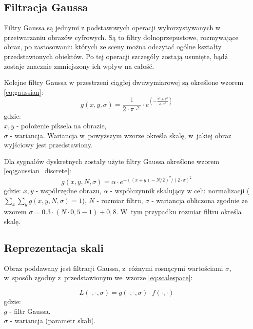\subsection{Filtracja Gaussa}
\label{subsec:filtracjaGaussa}
Filtry Gaussa są jednymi z podstawowych operacji wykorzystywanych w przetwarzaniu obrazów cyfrowych. Są to filtry dolnoprzepustowe, rozmywające obraz, po zastosowaniu których ze sceny można odczytać ogólne kształty przedstawionych obiektów. Po tej operacji szczegóły zostają usunięte, bądź zostaje znacznie zmniejszony ich wpływ na całość.

Kolejne filtry Gaussa w przestrzeni ciągłej dwuwymiarowej są określone wzorem \ref{eq:gaussian}:
\begin{equation}
\label{eq:gaussian}
g(x,y,\sigma)=\frac{1}{2 \cdot \pi \cdot ^ {2} }\cdot e^{(-\frac{x^{2} + y^{2}}{2 \cdot \sigma ^{2}})}
\end{equation}
gdzie:\\
$ x,y $ - położenie piksela na obrazie, \\
$ \sigma $ - wariancja.
\newline
Wariancja w~powyższym wzorze określa skalę, w~jakiej obraz wyjściowy jest przedstawiony. 

Dla sygnałów dyskretnych zostały użyte filtry Gaussa określone wzorem \ref{eq:gaussian_discrete}:
\begin{equation}
\label{eq:gaussian_discrete}
g(x,y,N,\sigma) = \alpha \cdot e^{-((x+y)-N/2)^2/(2 \cdot \sigma)^2}
\end{equation}
gdzie: \newline 
$ x, y$ - współrzędne obrazu, \newline
$ \alpha $ - współczynnik skalujący w celu normalizacji ($ \sum_x \sum_y g(x,y,N,\sigma) = 1 $), \newline
$ N $ - rozmiar filtru, \newline
$ \sigma $ - wariancja obliczona zgodnie ze wzorem $ \sigma = 0.3 \cdot (N \cdot 0,5 - 1) + 0,8$. \newline
W~tym przypadku rozmiar filtru określa skalę.

\subsection{Reprezentacja skali}
\label{subsec:reprezentacjaskali}
Obraz poddawany jest filtracji Gaussa, z~różnymi rosnącymi wartościami $ \sigma $, w~sposób zgodny z~przedstawionym we~wzorze \ref{eq:scalespace}:

\begin{equation}
\label{eq:scalespace}
L(\cdot,\cdot,\sigma) = g(\cdot,\cdot,\sigma)\cdot f(\cdot,\cdot)
\end{equation}
gdzie:\\
$ g $ - filtr Gaussa, \\
$ \sigma $ - wariancja (parametr skali).

